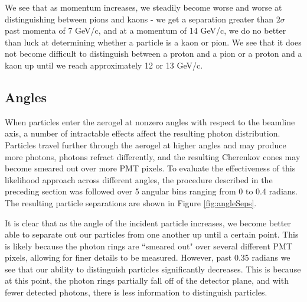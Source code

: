 \begin{figure}[]
\centering
{}
\caption[\TODO{}]{}
\label{fig:centeredMis} 
\end{figure}

We see that as momentum increases, we steadily become worse and worse at distinguishing between pions and kaons - we get a separation greater than $2 \sigma$ past momenta of 7 GeV/c, and at a momentum of 14 GeV/c, we do no better than luck at determining whether a particle is a kaon or pion.
We see that it does not become difficult to distinguish between a proton and a pion or a proton and a kaon up until we reach approximately 12 or 13 GeV/c. 

\subsection{Angles}
When particles enter the aerogel at nonzero angles with respect to the beamline axis, a number of intractable effects affect the resulting photon distribution. 
Particles travel further through the aerogel at higher angles and may produce more photons, photons refract differently, and the resulting Cherenkov cones may become smeared out over more PMT pixels. 
To evaluate the effectiveness of this likelihood approach across different angles, the procedure described in the preceding section was followed over 5 angular bins ranging from 0 to 0.4 radians.
The resulting particle separations are shown in Figure \ref{fig:angleSeps}.

It is clear that as the angle of the incident particle increases, we become better able to separate out our particles from one another up until a certain point.
This is likely because the photon rings are ``smeared out" over several different PMT pixels, allowing for finer details to be measured. 
However, past 0.35 radians we see that our ability to distinguish particles significantly decreases.
This is because at this point, the photon rings partially fall off of the detector plane, and with fewer detected photons, there is less information to distinguish particles.

